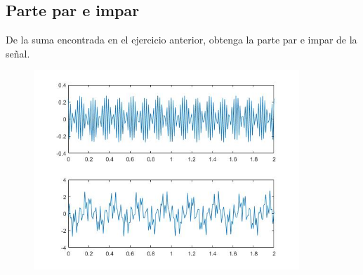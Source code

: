 \documentclass[12pt]{article}
\begin{document}
	\subsection{Parte par e impar}
	De la suma encontrada en el ejercicio anterior, obtenga la parte par e impar de la señal.
	
	\begin{figure}[h]
		\centering
		\includegraphics[width=10cm]{6_3.jpg}
	\end{figure}
	\newpage
\end{document}
